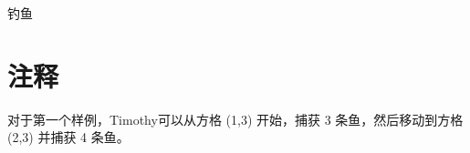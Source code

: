 \documentclass{xcpczh}
\begin{document}
\begin{problem}{钓鱼}
		\section*{注释}
		
		对于第一个样例，Timothy可以从方格 (1,3) 开始，捕获 3 条鱼，然后移动到方格 (2,3) 并捕获 4 条鱼。
	\end{problem}
\end{document}
